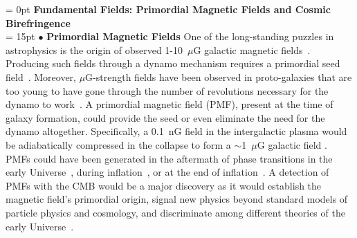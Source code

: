 \documentclass[PICOReport.tex]{subfiles}
\begin{document}
\vspace{0.1in}
\parindent = 0pt
{\bf Fundamental Fields: Primordial Magnetic Fields and Cosmic Birefringence} \\ %
\parindent = 15pt
$\bullet$ {\bf Primordial Magnetic Fields} \hspace{0.1in} One of the long-standing puzzles in astrophysics is the origin of observed 1-10~$\mu$G galactic magnetic fields~\citep{Widrow:2002ud}. Producing such fields through a dynamo mechanism requires a primordial seed field~\citep{Widrow:2011hs}. Moreover, $\mu$G-strength fields have been observed in proto-galaxies that are too young to have gone through the number of revolutions necessary for the dynamo to work~\citep{Athreya:1998}. A primordial magnetic field (PMF), present at the time of galaxy formation, could provide the seed or even eliminate the need for the dynamo altogether. Specifically, a 0.1~nG field in the intergalactic plasma would be adiabatically compressed in the collapse to form a $\sim$1~$\mu$G galactic field \citep{Grasso:2000wj}.
PMFs could have been generated in the aftermath of phase transitions in the early Universe~\citep{Vachaspati:1991nm}, during inflation~\cite{Turner:1987bw,Ratra:1991bn}, or at the end of inflation~\cite{DiazGil:2007dy}. A detection of PMFs with the CMB would be a major discovery as it would establish the magnetic field's primordial origin, signal new physics beyond standard models of particle physics and cosmology, and discriminate among different theories of the early Universe~\cite{Barnaby:2012tk,Long:2013tha,Durrer:2013pga}.
\end{document}
